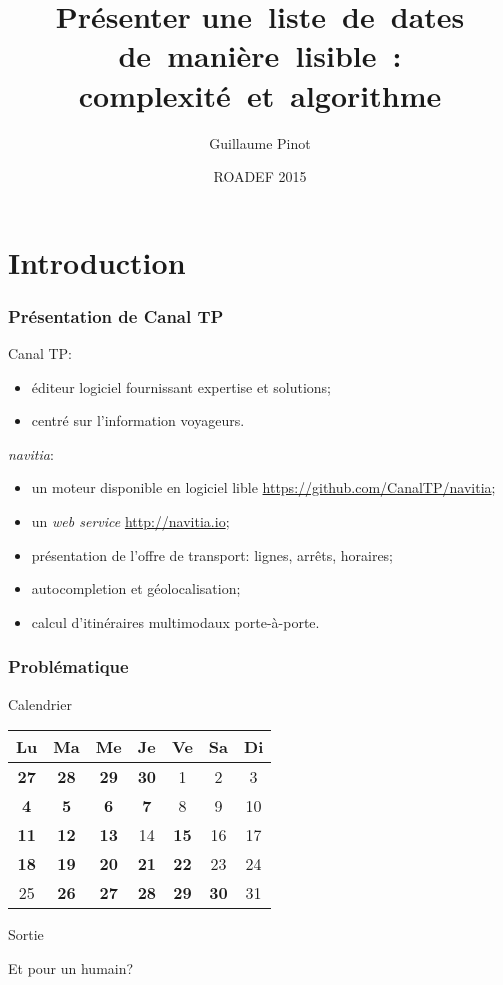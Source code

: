 \documentclass[table]{beamer}
\title[Présenter une~liste~de~dates de~manière~lisible]
{Présenter une~liste~de~dates de~manière~lisible~:
  complexité~et~algorithme}
\author{Guillaume Pinot}
\institute[Canal TP] %
{
  Canal TP\\
  20 rue Hector Malot\\
  75012 Paris, France\\
  \texttt{guillaume.pinot@canaltp.fr}}
\date{ROADEF 2015}
\newcommand{\+}{\cellcolor[gray]{1}\bfseries}
\newcommand{\<}{\cellcolor[gray]{0.8}\rmfamily\itshape}
\newcommand*{\foreign}[2][english]{%
    \emph{\foreignlanguage{#1}{#2}}%
}
\begin{document}
\begin{frame}
  \titlepage    
\end{frame}

\section*{Introduction}

\begin{frame}
  \frametitle{Présentation de Canal TP}

  Canal TP:
  \begin{itemize}
  \item éditeur logiciel fournissant expertise et solutions;
  \item centré sur l'information voyageurs.
  \end{itemize}

  \emph{navitia}:
  \begin{itemize}
  \item un moteur disponible en logiciel lible
    \url{https://github.com/CanalTP/navitia};
  \item un \foreign{web service} \url{http://navitia.io};
  \item présentation de l'offre de transport: lignes, arrêts, horaires;
  \item autocompletion et géolocalisation;
  \item calcul d'itinéraires multimodaux porte-à-porte.
  \end{itemize}
\end{frame}

\begin{frame}
  \frametitle{Problématique}

  \begin{block}{Calendrier}
    \centering
    \begin{tabular}{|ccccccc|}
      \hline
      Lu  & Ma & Me & Je & Ve & Sa & Di\\
      \hline
      \+27&\+28&\+29&\+30&  1 &  2 &  3\\
      \+4 & \+5& \+6& \+7&  8 &  9 & 10\\
      \+11&\+12&\+13& 14 &\+15& 16 & 17\\
      \+18&\+19&\+20&\+21&\+22& 23 & 24\\
      25  &\+26&\+27&\+28&\+29&\+30& 31\\
      \hline
    \end{tabular}
  \end{block}

  \begin{block}{Sortie}
  \end{block}

  Et pour un humain?
\end{frame}
\end{document}
